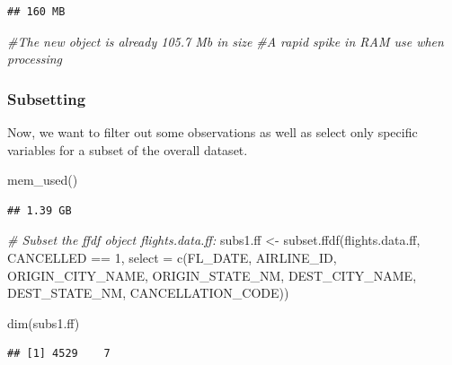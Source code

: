 \documentclass[
  12pt,
]{style/krantz}
\newenvironment{Shaded}{\begin{snugshade}}{\end{snugshade}}
\newcommand{\AttributeTok}[1]{\textcolor[rgb]{0.77,0.63,0.00}{#1}}
\newcommand{\CommentTok}[1]{\textcolor[rgb]{0.56,0.35,0.01}{\textit{#1}}}
\newcommand{\DecValTok}[1]{\textcolor[rgb]{0.00,0.00,0.81}{#1}}
\newcommand{\FunctionTok}[1]{\textcolor[rgb]{0.00,0.00,0.00}{#1}}
\newcommand{\NormalTok}[1]{#1}
\newcommand{\OtherTok}[1]{\textcolor[rgb]{0.56,0.35,0.01}{#1}}
\newcommand{\SpecialCharTok}[1]{\textcolor[rgb]{0.00,0.00,0.00}{#1}}
\begin{document}
\begin{verbatim}
## 160 MB
\end{verbatim}

\begin{Shaded}
\begin{Highlighting}[]
\CommentTok{\#The new object is already 105.7 Mb in size}
\CommentTok{\#A rapid spike in RAM use when processing}
\end{Highlighting}
\end{Shaded}

\hypertarget{subsetting}{%
\subsubsection{Subsetting}\label{subsetting}}

Now, we want to filter out some observations as well as select only specific variables for a subset of the overall dataset.

\begin{Shaded}
\begin{Highlighting}[]
\FunctionTok{mem\_used}\NormalTok{()}
\end{Highlighting}
\end{Shaded}

\begin{verbatim}
## 1.39 GB
\end{verbatim}

\begin{Shaded}
\begin{Highlighting}[]
\CommentTok{\# Subset the ffdf object flights.data.ff:}
\NormalTok{subs1.ff }\OtherTok{\textless{}{-}} \FunctionTok{subset.ffdf}\NormalTok{(flights.data.ff, CANCELLED }\SpecialCharTok{==} \DecValTok{1}\NormalTok{, }
                        \AttributeTok{select =} \FunctionTok{c}\NormalTok{(FL\_DATE, AIRLINE\_ID, }
\NormalTok{                                   ORIGIN\_CITY\_NAME,}
\NormalTok{                                   ORIGIN\_STATE\_NM,}
\NormalTok{                                   DEST\_CITY\_NAME,}
\NormalTok{                                   DEST\_STATE\_NM,}
\NormalTok{                                   CANCELLATION\_CODE))}

\FunctionTok{dim}\NormalTok{(subs1.ff)}
\end{Highlighting}
\end{Shaded}

\begin{verbatim}
## [1] 4529    7
\end{verbatim}
\end{document}
